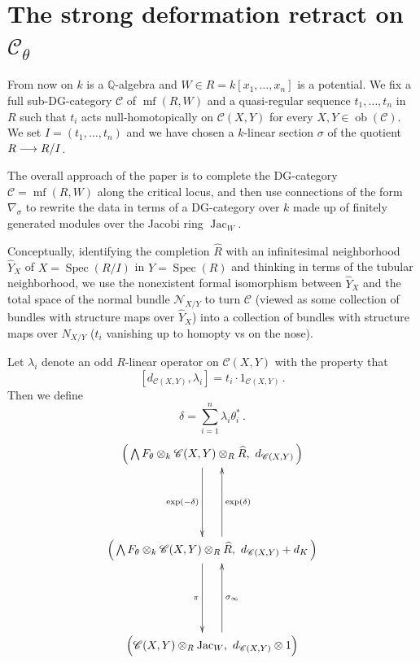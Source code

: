 \documentclass[english,letter paper,12pt,leqno]{article}
\theoremstyle{example}
\numberwithin{equation}{section}
\def\jac{\operatorname{Jac}_W}
\DeclareMathOperator{\mf}{mf}
\DeclareMathOperator{\Spec}{Spec}
\begin{document}
\section{The strong deformation retract on $\mathscr{C}_\theta$}

From now on $k$ is a $\mathbb{Q}$-algebra and $W \in R = k[x_1,\ldots,x_n]$ is a potential. We fix a full sub-DG-category $\mathscr{C}$ of $\mf(R,W)$ and a quasi-regular sequence $t_1,\ldots,t_n$ in $R$ such that $t_i$ acts null-homotopically on $\mathscr{C}(X,Y)$ for every $X,Y \in \operatorname{ob}(\mathscr{C})$. We set $I = (t_1,\ldots,t_n)$ and we have chosen a $k$-linear section $\sigma$ of the quotient $R \longrightarrow R/I$.

The overall approach of the paper is to complete the DG-category $\mathscr{C} = \mf(R,W)$ along the critical locus, and then use connections of the form $\nabla_\sigma$ to rewrite the data in terms of a DG-category over $k$ made up of finitely generated modules over the Jacobi ring $\jac$.

Conceptually, identifying the completion $\widehat{R}$ with an infinitesimal neighborhood $\widehat{Y}_X$ of $X = \Spec(R/I)$ in $Y = \Spec(R)$ and thinking in terms of the tubular neighborhood, we use the nonexistent formal isomorphism between $\widehat{Y}_X$ and the total space of the normal bundle $\mathscr{N}_{X/Y}$ to turn $\mathscr{C}$ (viewed as some collection of bundles with structure maps over $\widehat{Y}_X$) into a collection of bundles with structure maps over $N_{X/Y}$ ($t_i$ vanishing up to homopty vs on the nose).

Let $\lambda_i$ denote an odd $R$-linear operator on $\mathscr{C}(X,Y)$ with the property that
\[
[ d_{\mathscr{C}(X,Y)}, \lambda_i ] = t_i \cdot 1_{\mathscr{C}(X,Y)}\,.
\]
Then we define
\[
\delta = \sum_{i=1}^n \lambda_i \theta_i^*\,.
\]
\begin{equation}
\xymatrix@C+3pc@R+3pc{
\Big( \bigwedge F_\theta \otimes_k \mathscr{C}(X,Y) \otimes_R \widehat{R}, \,\, d_{\mathscr{C}(X,Y)}\, \Big) \ar@<-2ex>[d]_-{\exp(-\delta)}\\
\Big( \bigwedge F_\theta \otimes_k \mathscr{C}(X,Y) \otimes_R \widehat{R}, \,\, d_{\mathscr{C}(X,Y)} + d_K\, \Big) \ar@<-2ex>[u]_-{\exp(\delta)} \ar@<-2ex>[d]_-{\pi} \\
\Big( \mathscr{C}(X,Y) \otimes_R \jac, \,\, d_{\mathscr{C}(X,Y)} \otimes 1 \Big) \ar@<-2ex>[u]_-{\sigma_\infty}
}
\end{equation}


\newpage
\end{document}
